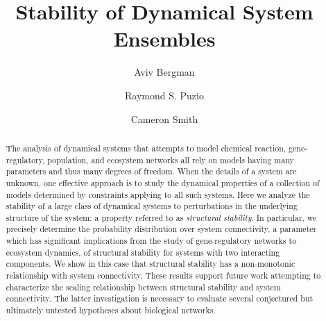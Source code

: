 \documentclass{amsart}
\theoremstyle{definition}
\theoremstyle{remark}
\numberwithin{equation}{section}
\begin{document}
\title{Stability of Dynamical System Ensembles}

\author{Aviv Bergman}
\address{Department of Systems and Computational Biology, Albert Einstein College of Medicine, Bronx, New York 10461}
\curraddr{}

\author{Raymond S. Puzio}
\address{Department of Systems and Computational Biology, Albert Einstein College of Medicine, Bronx, New York 10461}
\curraddr{}

\author{Cameron Smith}
\address{Department of Systems and Computational Biology, Albert Einstein College of Medicine, Bronx, New York 10461}
\curraddr{}





\begin{abstract}
The analysis of dynamical systems that attempts to model chemical reaction, gene-regulatory, population, and ecosystem networks all rely on models having many parameters and thus many degrees of freedom. When the details of a system are unknown, one effective approach is to study the dynamical properties of a collection of models determined by constraints applying to all such systems. Here we analyze the stability of a large class of dynamical systems to perturbations in the underlying structure of the system: a property referred to as \emph{structural stability}. In particular, we precisely determine the probability distribution over system connectivity, a parameter which has significant implications from the study of gene-regulatory networks to ecosystem dynamics, of structural stability for systems with two interacting components. We show in this case that structural stability has a non-monotonic relationship with system connectivity. These results support future work attempting to characterize the scaling relationship between structural stability and system connectivity. The latter investigation is necessary to evaluate several conjectured but ultimately untested hypotheses about biological networks.
\end{abstract}
\end{document}
